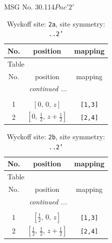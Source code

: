 \documentclass[fleqn,8pt]{jsarticle}
\begin{document}
\setcounter{MaxMatrixCols}{32}

\renewcommand{\tablename}{Table~}
\renewcommand{\figurename}{Figure~}
\begin{center}
\LARGE
MSG No. 30.114\quad$Pnc'2'$
\end{center}
\renewcommand{\arraystretch}{1.2}
\begin{longtable}{ccc}
\caption{Wyckoff site: {\tt 2a}, site symmetry: {\tt ..2'}}
 \\
 \hline \hline
No. & position & mapping \\ \hline \endfirsthead

\multicolumn{2}{l}{\tablename\ \thetable{}} \\
 \hline \hline
No. & position & mapping \\ \hline \endhead

 \hline \hline
\multicolumn{2}{r}{\footnotesize\it continued ...} \\ \endfoot

 \hline \hline
\multicolumn{2}{r}{} \\ \endlastfoot

1 & $\left[ 0,\, 0,\, z \right]$ & {\tt [1,3]} \\ \hline
2 & $\left[ 0,\, \frac{1}{2},\, z + \frac{1}{2} \right]$ & {\tt [2,4]} \\
\end{longtable}
\renewcommand{\arraystretch}{1.2}
\begin{longtable}{ccc}
\caption{Wyckoff site: {\tt 2b}, site symmetry: {\tt ..2'}}
 \\
 \hline \hline
No. & position & mapping \\ \hline \endfirsthead

\multicolumn{2}{l}{\tablename\ \thetable{}} \\
 \hline \hline
No. & position & mapping \\ \hline \endhead

 \hline \hline
\multicolumn{2}{r}{\footnotesize\it continued ...} \\ \endfoot

 \hline \hline
\multicolumn{2}{r}{} \\ \endlastfoot

1 & $\left[ \frac{1}{2},\, 0,\, z \right]$ & {\tt [1,3]} \\ \hline
2 & $\left[ \frac{1}{2},\, \frac{1}{2},\, z + \frac{1}{2} \right]$ & {\tt [2,4]} \\
\end{longtable}
\end{document}
